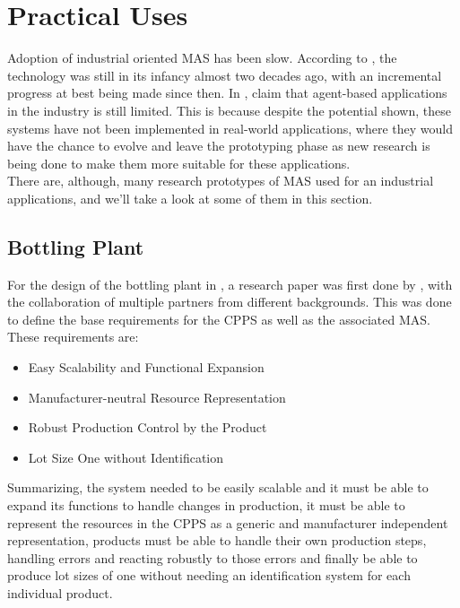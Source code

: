 \section{Practical Uses}
\label{sec:practical_uses}

Adoption of industrial oriented \gls{MAS} has been slow. According to \citeauthor{karnouskos02} \cite{karnouskos02}, the technology was still in its infancy almost two decades ago, with an incremental progress at best being made since then. In \cite{Karnouskos2019}, \citeauthor{Karnouskos2019} claim that agent-based applications in the industry is still limited. This is because despite the potential shown, these systems have not been implemented in real-world applications, where they would have the chance to evolve and leave the prototyping phase as new research is being done to make them more suitable for these applications.\\

There are, although, many research prototypes of \gls{MAS} used for an industrial applications, and we'll take a look at some of them in this section.

\subsection{Bottling Plant}
\label{subsec:bottling_plant}

For the design of the bottling plant in \cite{bottling_plant_part2}, a research paper \cite{bottling_plant_part1} was first done by \citeauthor{bottling_plant_part1}, with the collaboration of multiple partners from different backgrounds. This was done to define the base requirements for the \gls{CPPS} as well as the associated \gls{MAS}. These requirements are:

\begin{itemize}
	\item Easy Scalability and Functional Expansion
	\item Manufacturer-neutral Resource Representation
	\item Robust Production Control by the Product
	\item Lot Size One without Identification
\end{itemize}

Summarizing, the system needed to be easily scalable and it must be able to expand its functions to handle changes in production, it must be able to represent the resources in the \gls{CPPS} as a generic and manufacturer independent representation, products must be able to handle their own production steps, handling errors and reacting robustly to those errors and finally be able to produce lot sizes of one without needing an identification system for each individual product.\\

